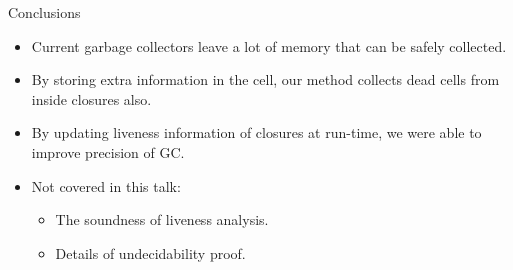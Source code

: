 \documentclass[xcolor=x11names,compress,mathserif]{beamer}
\renewcommand{\(}{\begin{columns}}
\renewcommand{\)}{\end{columns}}
\newcommand{\<}[1]{\begin{column}{#1}}
\renewcommand{\>}{\end{column}}
\begin{document}
\begin{frame}{Conclusions}
  \begin{itemize}\itemsep1em
  \item Current garbage collectors leave a lot of memory that can be safely collected. 
  \item By storing extra information in the cell, our method collects dead cells from inside closures also.
  \item By updating liveness information of closures at run-time, we were able to improve precision of GC.
  \item Not covered in this talk:
    \begin{itemize}
    \item The soundness of liveness analysis.
    \item Details of undecidability proof.
    \end{itemize}
  \end{itemize}
\end{frame}
\end{document}
